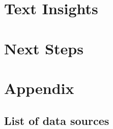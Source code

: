 \documentclass[
]{agujournal2019}
\begin{document}
\section{Text Insights}\label{text-insights}

\section{Next Steps}\label{next-steps}

\section{Appendix}\label{appendix}

\subsection{List of data sources}\label{sec-sources}
\end{document}
